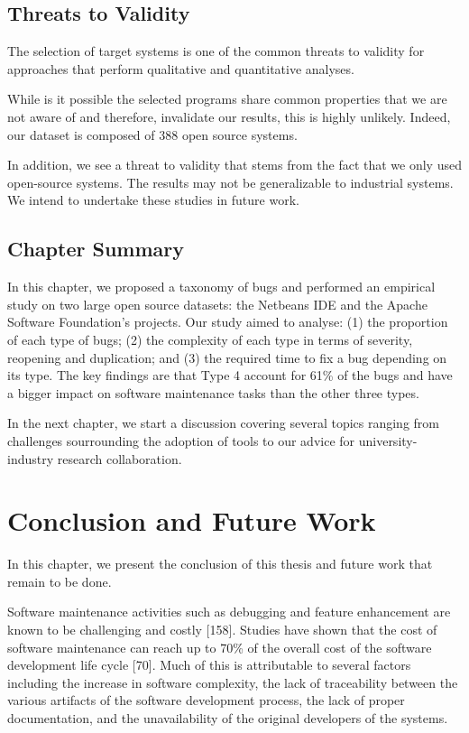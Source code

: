 \documentclass[12pt]{report}
\begin{document}
\section{Threats to Validity}\label{threats-to-validity-5}

The selection of target systems is one of the common threats to validity
for approaches that perform qualitative and quantitative analyses.

While is it possible the selected programs share common properties that
we are not aware of and therefore, invalidate our results, this is
highly unlikely. Indeed, our dataset is composed of 388 open source
systems.

In addition, we see a threat to validity that stems from the fact that
we only used open-source systems. The results may not be generalizable
to industrial systems. We intend to undertake these studies in future
work.

\section{Chapter Summary}\label{chapter-summary-5}

In this chapter, we proposed a taxonomy of bugs and performed an
empirical study on two large open source datasets: the Netbeans IDE and
the Apache Software Foundation's projects. Our study aimed to analyse:
(1) the proportion of each type of bugs; (2) the complexity of each type
in terms of severity, reopening and duplication; and (3) the required
time to fix a bug depending on its type. The key findings are that Type
4 account for 61\% of the bugs and have a bigger impact on software
maintenance tasks than the other three types.

In the next chapter, we start a discussion covering several topics
ranging from challenges sourrounding the adoption of tools to our advice
for university-industry research collaboration.

\chapter{Conclusion and Future Work}\label{conclusion-and-future-work}

In this chapter, we present the conclusion of this thesis and future
work that remain to be done.

Software maintenance activities such as debugging and feature
enhancement are known to be challenging and costly {[}158{]}. Studies
have shown that the cost of software maintenance can reach up to 70\% of
the overall cost of the software development life cycle {[}70{]}. Much
of this is attributable to several factors including the increase in
software complexity, the lack of traceability between the various
artifacts of the software development process, the lack of proper
documentation, and the unavailability of the original developers of the
systems.
\end{document}
